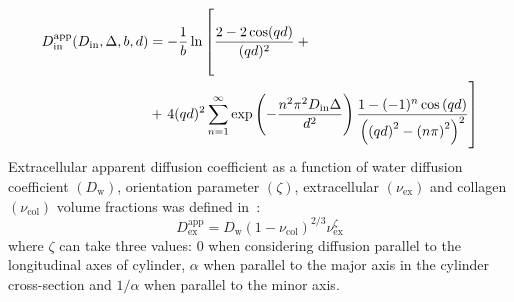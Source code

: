 \begin{equation}\label{eq: Karger AppEx}
\begin{split}
	D^{\mathrm{app}}_{\mathrm{in}} (D_{\mathrm{in}},\Delta, b, d) &= -\dfrac{1}{b} \ln  \left[ \frac{2 - 2 \cos(qd)}{(qd)^2} + \vphantom{ \exp \left( - \frac{n^2 \pi^2 D_{\mathrm{in}} \Delta}{d^2}\right)\frac{1-(-1)^n \cos{(qd)}}{\left( \left(qd\right)^2 - \left( n \pi\right)^2\right)^2}} \right. \\
                   &+ \left. 4(qd)^2 \sum^{\infty}_{n=1} \exp \left( - \frac{n^2 \pi^2 D_{\mathrm{in}} \Delta}{d^2}\right)\frac{1-(-1)^n \cos{(qd)}}{\left( \left(qd\right)^2 - \left( n \pi\right)^2\right)^2} \right]
\end{split}
\end{equation}
Extracellular apparent diffusion coefficient as a function of water diffusion coefficient $(D_{\mathrm{w}})$, orientation parameter $(\zeta)$, extracellular $(\nu_{\mathrm{ex}})$ and collagen $(\nu_{\mathrm{col}})$ volume fractions was defined in~\cite{RND12}:
\begin{equation}\label{eq: Karger AppEx}
D^{\mathrm{app}}_{\mathrm{ex}}=D_{\mathrm{w}}(1-\nu_{\mathrm{col}})^{2/3}\nu_{\mathrm{ex}}^\zeta
\end{equation}
where $\zeta$ can take three values: 0 when considering diffusion parallel to the longitudinal axes of cylinder, $\alpha$ when parallel to the major axis in the cylinder cross-section and $1/\alpha$ when parallel to the minor axis.

